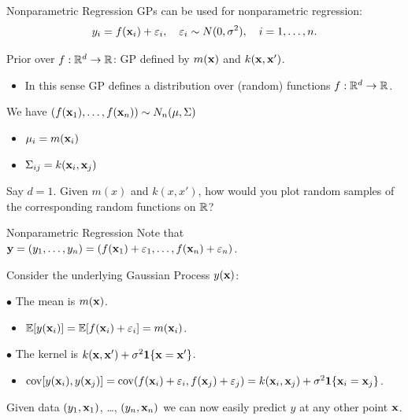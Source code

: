 \documentclass[11pt,handout,aspectratio=169]{beamer}
\begin{document}
\begin{frame}{Nonparametric Regression}
GPs can be used for nonparametric regression:
    \[
    y_i = f(\mathbf{x}_i) + \varepsilon_i, \quad \varepsilon_i \sim {N}(0, \sigma^2),\quad i=1,\ldots, n.
    \]
    
Prior over \( f:\mathbb R^d\to \mathbb R \): GP defined by \( m(\mathbf{x}) \) and \( k(\mathbf{x}, \mathbf{x}') \).
    \begin{itemize}
    \item In this sense GP defines a distribution over (random) functions $f: \mathbb R^d\to \mathbb R$.
    \end{itemize}    
    \medskip 
    
We have $(f(\mathbf{x}_1),\ldots,f(\mathbf{x}_n))\sim N_n(\mu,\Sigma)$ 
    \begin{itemize}
    \item $\mu_i=m(\mathbf{x}_i)$
    \item $\Sigma_{ij}=k(\mathbf{x}_i,\mathbf{x}_j)$
    \end{itemize}
    
    \begin{alertblock}{}
    	Say $d=1$. Given \( m(x) \) and \( k(x, x') \), how would you plot random samples of the corresponding random functions on $\mathbb R$?
    \end{alertblock}

\end{frame}

\begin{frame}{Nonparametric Regression}
Note that $\mathbf{y}=(y_1,\ldots,y_n)=(f(\mathbf{x}_1)+\varepsilon_1,\ldots,f(\mathbf{x}_n)+\varepsilon_n)$.
\bigskip

Consider the underlying Gaussian Process $y(\mathbf{x})$:
\medskip 

$\bullet$ The mean is $m(\mathbf{x})$.
\begin{itemize}
	\item  $\mathbb E[y(\mathbf{x}_i)]=\mathbb E[f(\mathbf{x}_i)+\varepsilon_i]=m(\mathbf{x}_i)$.
\end{itemize}

$\bullet$  The kernel is $k(\mathbf{x},\mathbf{x}')+\sigma^2\boldsymbol 1\{\mathbf{x}=\mathbf{x}'\}$. 
\begin{itemize}
	\item  $\operatorname*{cov}[y(\mathbf{x}_i),y(\mathbf{x}_j)]=\operatorname*{cov}(f(\mathbf{x}_i)+\varepsilon_i,f(\mathbf{x}_j)+\varepsilon_j)=k(\mathbf{x}_i,\mathbf{x}_j)+\sigma^2\boldsymbol 1\{\mathbf{x}_i=\mathbf{x}_j\}$.
\end{itemize}

\begin{alertblock}{}
Given data $(y_1,\mathbf{x}_1)$, \ldots, $(y_n,\mathbf{x}_n)$ we can now easily predict $y$ at any other point $\mathbf{x}$.	
\end{alertblock}
\end{frame}
\end{document}
